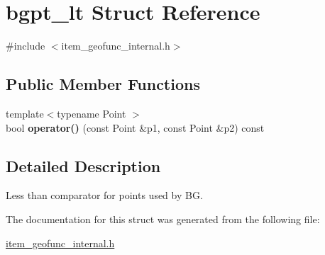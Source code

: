 \hypertarget{structbgpt__lt}{}\section{bgpt\+\_\+lt Struct Reference}
\label{structbgpt__lt}


{\ttfamily \#include $<$item\+\_\+geofunc\+\_\+internal.\+h$>$}

\subsection*{Public Member Functions}
\begin{DoxyCompactItemize}
\item 
\mbox{\label{structbgpt__lt_ae6309fb4ad9bcda633025e37c9ff3d44}} 
{\footnotesize template$<$typename Point $>$ }\\bool {\bfseries operator()} (const Point \&p1, const Point \&p2) const
\end{DoxyCompactItemize}


\subsection{Detailed Description}
Less than comparator for points used by BG. 

The documentation for this struct was generated from the following file\+:\begin{DoxyCompactItemize}
\item 
\mbox{\hyperlink{item__geofunc__internal_8h}{item\+\_\+geofunc\+\_\+internal.\+h}}\end{DoxyCompactItemize}
